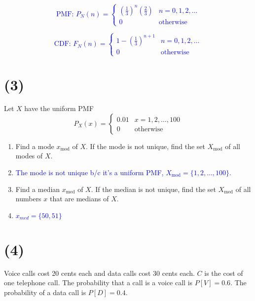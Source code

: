 \documentclass[12pt]{article}
\begin{document}
\textcolor{blue}{
\[
\text{PMF: } P_N(n) = 
\begin{cases}
\left(\frac{1}{3}\right)^n \left(\frac{2}{3}\right) & n = 0, 1, 2, \ldots \\
0 & \text{otherwise}
\end{cases}
\]
}

\textcolor{blue}{
\[
\text{CDF: } F_N(n) =
\begin{cases}
 1 - \left(\frac{1}{3}\right)^{n+1}& n = 0, 1, 2, \ldots\\
0 & \text{otherwise}
\end{cases}
\]}

\section*{(3)}
Let $X$ have the uniform PMF
\[
P_X(x) =
\begin{cases}
0.01 & x = 1, 2, \ldots, 100 \\
0 & \text{otherwise}
\end{cases}
\]

\begin{enumerate}
    \item[(a)] Find a mode $x_{\text{mod}}$ of $X$. If the mode is not unique, find the set $X_{\text{mod}}$ of all modes of $X$.
    \item[] \textcolor{blue}{The mode is not unique b/c it's a uniform PMF, $X_{\text{mod}} = \{1, 2, \ldots, 100\}$.}
    \item[(b)] Find a median $x_{\text{med}}$ of $X$. If the median is not unique, find the set $X_{\text{med}}$ of all numbers $x$ that are medians of $X$.
    \item[] \textcolor{blue}{$x_{med} = \{50,51\}$}
\end{enumerate}
\newpage

\section*{(4)}
Voice calls cost 20 cents each and data calls cost 30 cents each. $C$ is the cost of one telephone call. The probability that a call is a voice call is $P[V] = 0.6$. The probability of a data call is $P[D] = 0.4$.
\end{document}
